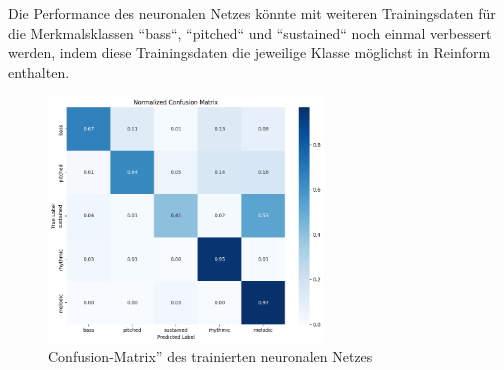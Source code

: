 \begin{adjustwidth}{0.5cm}{0cm}
Die Performance des neuronalen Netzes könnte mit weiteren Trainingsdaten für die Merkmalsklassen ``bass``, ``pitched`` und ``sustained`` noch einmal verbessert werden, indem diese Trainingsdaten die jeweilige Klasse möglichst in Reinform enthalten.

\begin{figure}[h!]
\centering
\includegraphics[width=0.65\textwidth]{images/10_test_validierung/nn/nn-confusion-matrix.png}
\caption{Confusion-Matrix” des trainierten neuronalen Netzes}
\label{fig:img-confusion-matrix}
\end{figure}

\end{adjustwidth}


